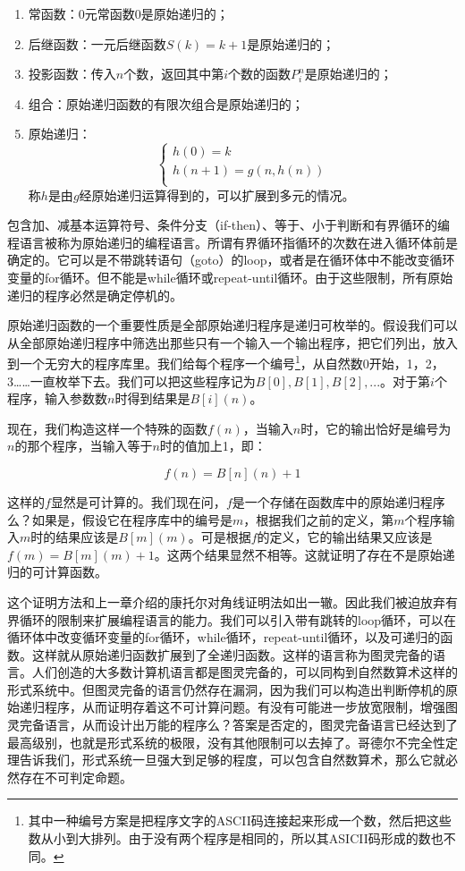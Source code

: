 \documentclass{article}
\begin{document}
\begin{enumerate}
\item 常函数：0元常函数0是原始递归的；
\item 后继函数：一元后继函数$S(k) = k + 1$是原始递归的；
\item 投影函数：传入$n$个数，返回其中第$i$个数的函数$P_i^n$是原始递归的；
\item 组合：原始递归函数的有限次组合是原始递归的；
\item 原始递归：
\[
\begin{cases}
h(0) = k \\
h(n + 1) = g(n, h(n)) \\
\end{cases}
\]
称$h$是由$g$经原始递归运算得到的，可以扩展到多元的情况。
\end{enumerate}

包含加、减基本运算符号、条件分支（if-then）、等于、小于判断和有界循环的编程语言被称为原始递归的编程语言。所谓有界循环指循环的次数在进入循环体前是确定的。它可以是不带跳转语句（goto）的loop，或者是在循环体中不能改变循环变量的for循环。但不能是while循环或repeat-until循环。由于这些限制，所有原始递归的程序必然是确定停机的。

原始递归函数的一个重要性质是全部原始递归程序是递归可枚举的。假设我们可以从全部原始递归程序中筛选出那些只有一个输入一个输出程序，把它们列出，放入到一个无穷大的程序库里。我们给每个程序一个编号\footnote{其中一种编号方案是把程序文字的ASCII码连接起来形成一个数，然后把这些数从小到大排列。由于没有两个程序是相同的，所以其ASICII码形成的数也不同。}，从自然数0开始，1，2，3……一直枚举下去。我们可以把这些程序记为$B[0], B[1], B[2], ...$。对于第$i$个程序，输入参数数$n$时得到结果是$B[i](n)$。

现在，我们构造这样一个特殊的函数$f(n)$，当输入$n$时，它的输出恰好是编号为$n$的那个程序，当输入等于$n$时的值加上1，即：

\[
f(n) = B[n](n) + 1
\]

这样的$f$显然是可计算的。我们现在问，$f$是一个存储在函数库中的原始递归程序么？如果是，假设它在程序库中的编号是$m$，根据我们之前的定义，第$m$个程序输入$m$时的结果应该是$B[m](m)$。可是根据$f$的定义，它的输出结果又应该是$f(m) = B[m](m) + 1$。这两个结果显然不相等。这就证明了存在不是原始递归的可计算函数。

这个证明方法和上一章介绍的康托尔对角线证明法如出一辙。因此我们被迫放弃有界循环的限制来扩展编程语言的能力。我们可以引入带有跳转的loop循环，可以在循环体中改变循环变量的for循环，while循环，repeat-until循环，以及可递归的函数。这样就从原始递归函数扩展到了全递归函数。这样的语言称为图灵完备的语言。人们创造的大多数计算机语言都是图灵完备的，可以同构到自然数算术这样的形式系统中。但图灵完备的语言仍然存在漏洞，因为我们可以构造出判断停机的原始递归程序，从而证明存着这不可计算问题。有没有可能进一步放宽限制，增强图灵完备语言，从而设计出万能的程序么？答案是否定的，图灵完备语言已经达到了最高级别，也就是形式系统的极限，没有其他限制可以去掉了。哥德尔不完全性定理告诉我们，形式系统一旦强大到足够的程度，可以包含自然数算术，那么它就必然存在不可判定命题。
\end{document}
